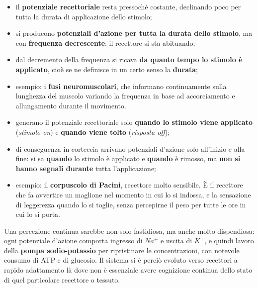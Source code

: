 \begin{itemize}
  \item il \textbf{potenziale recettoriale} resta pressoché costante, declinando poco per tutta la
    durata di applicazione dello stimolo;
  \item si producono \textbf{potenziali d'azione per tutta la durata dello stimolo}, ma con
    \textbf{frequenza decrescente}: il recettore si sta abituando;
  \item dal decremento della frequenza si ricava \textbf{da quanto tempo lo stimolo è applicato},
    cioè se ne definisce in un certo senso la \textbf{durata};
  \item esempio: i \textbf{fusi neuromuscolari}, che informano continuamente sulla lunghezza del
    muscolo variando la frequenza in base ad accorciamento e allungamento durante il movimento.
\end{itemize}

\begin{itemize}
  \item generano il potenziale recettoriale solo \textbf{quando lo stimolo viene applicato}
    (\textit{stimolo on}) e \textbf{quando viene tolto} (\textit{risposta off});
  \item di conseguenza in corteccia arrivano potenziali d'azione solo all'inizio e alla fine:
    si sa \textbf{quando} lo stimolo è applicato e \textbf{quando} è rimosso, ma \textbf{non si
    hanno segnali durante} tutta l'applicazione;
  \item esempio: il \textbf{corpuscolo di Pacini}, recettore molto sensibile. È il recettore che fa
    avvertire un maglione nel momento in cui lo si indossa, e la sensazione di leggerezza quando lo
    si toglie, senza percepirne il peso per tutte le ore in cui lo si porta.
\end{itemize}

Una percezione continua sarebbe non solo fastidiosa, ma anche molto dispendiosa: ogni potenziale
d'azione comporta ingresso di $Na^+$ e uscita di $K^+$, e quindi lavoro della \textbf{pompa
sodio-potassio} per ripristinare le concentrazioni, con notevole consumo di ATP e di glucosio. Il
sistema si è perciò evoluto verso recettori a rapido adattamento là dove non è essenziale avere
cognizione continua dello stato di quel particolare recettore o tessuto.
